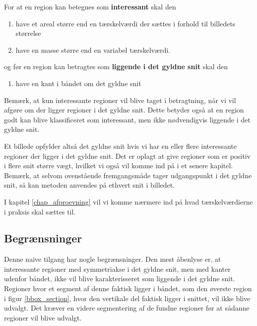 {\noindent For at en region kan betegnes som \textbf{interessant} skal den
\begin{enumerate}
        \renewcommand{\labelenumi}{(\alph{enumi})}
    \item have et areal større end en tærskelværdi der sættes i
        forhold til billedets størrelse
    \item have en masse større end en variabel tærskelværdi.
\end{enumerate}
og før en region kan betragtes som \textbf{liggende i det gyldne
snit} skal den
\begin{enumerate}
        \renewcommand{\labelenumi}{(\alph{enumi})}
        \setcounter{enumi}{2}
    \item have en kant i båndet om det gyldne snit
\end{enumerate}

Bemærk, at kun interessante regioner vil blive taget i betragtning, når vi vil
afgøre om der ligger regioner i det gyldne snit. Dette betyder også at
en region godt kan blive klassificeret som interessant, men ikke
nødvendigvis liggende i det gyldne snit.

Et billede opfylder altså det gyldne snit hvis vi har en eller flere
interessante regioner der ligger i det gyldne snit.  Det er oplagt at
give regioner som er positiv i flere snit større vægt, hvilket vi også
vil komme ind på i et senere kapitel. Bemærk, at selvom ovenstående
fremgangsmåde tager udgangspunkt i det gyldne snit, så kan metoden
anvendes på ethvert snit i billedet.

I kapitel \ref{chap_afproevning} vil vi komme nærmere ind på hvad
tærskelværdierne i praksis skal sættes til.

\subsection{Begrænsninger}
Denne naive tilgang har nogle begrænsninger.  Den mest åbenlyse er, at
interessante regioner med symmetriakse i det gyldne snit, men med kanter udenfor
båndet, ikke vil blive karakterisseret som liggende i det gyldne snit.
Regioner hvor et segment af denne faktisk ligger i båndet, som den
øverste region i figur \ref{bbox_section}, hvor den vertikale del faktisk
ligger i snittet, vil ikke blive udvalgt.  Det kræver en videre
segmentering af de fundne regioner før at sådanne regioner vil blive
udvalgt.

}

